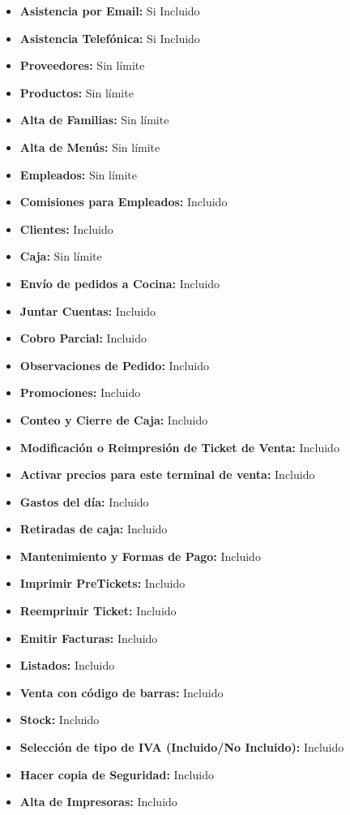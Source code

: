 \documentclass[12pt,a4paper]{article}
\begin{document}
\begin{itemize}
\item \textbf {Asistencia por Email: }Si Incluido
\item \textbf {Asistencia Telefónica:} Si Incluido
\item \textbf {Proveedores:} Sin límite
\item \textbf {Productos:} Sin límite
\item \textbf {Alta de Familias:} Sin límite
\item \textbf {Alta de Menús:} Sin límite
\item \textbf {Empleados:} Sin límite
\item \textbf {Comisiones para Empleados:} Incluido
\item \textbf {Clientes:} Incluido
\item \textbf {Caja:} Sin límite
\item \textbf {Envío de pedidos a Cocina:} Incluido
\item \textbf {Juntar Cuentas:} Incluido
\item \textbf {Cobro Parcial:} Incluido
\item \textbf {Observaciones de Pedido:} Incluido
\item \textbf {Promociones:} Incluido
\item \textbf {Conteo y Cierre de Caja:} Incluido
\item \textbf {Modificación o Reimpresión de Ticket de Venta:} Incluido
\item \textbf {Activar precios para este terminal de venta:} Incluido
\item \textbf {Gastos del día:} Incluido
\item \textbf {Retiradas de caja:} Incluido
\item \textbf {Mantenimiento y Formas de Pago:} Incluido
\item \textbf {Imprimir PreTickets:} Incluido
\item \textbf {Reemprimir Ticket:} Incluido
\item \textbf {Emitir Facturas:} Incluido
\item \textbf {Listados:} Incluido
\item \textbf {Venta con código de barras:} Incluido
\item \textbf {Stock:} Incluido
\item \textbf {Selección de tipo de IVA (Incluido/No Incluido):} Incluido
\item \textbf {Hacer copia de Seguridad:} Incluido
\item \textbf {Alta de Impresoras: }Incluido

\end{itemize}
\end{document}
